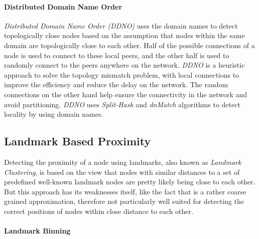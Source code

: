 \documentclass[acmcsur,acmnow]{acmtrans2m}
\begin{document}
\paragraph*{\bf Distributed Domain Name Order}

\emph{Distributed Domain Name Order (DDNO)} \cite{zeinalipour-yazti_ddno_2005}
uses the domain names to detect topologically close nodes based on the
assumption that nodes within the same domain are topologically close to each
other. Half of the possible connections of a node is used to connect to these
local peers, and the other half is used to randomly connect to the peers
anywhere on the network.  \textit{DDNO} is a heuristic approach to solve the
topology mismatch problem, with local connections to improve the efficiency and
reduce the delay on the network.  The random connections on the other hand help
ensure the connectivity in the network and avoid partitioning. \textit{DDNO}
uses \textit{Split-Hash} and \textit{dnMatch} algorithms to detect locality by
using domain names.

\subsection{Landmark Based Proximity}\label{sec:landmark}

Detecting the proximity of a node using landmarks, also known as \textit{Landmark
Clustering}, is based on the view that nodes with similar distances to a
set of predefined well-known landmark nodes are pretty likely being close to
each other. But this approach has its weaknesses itself, like the fact that
is a rather coarse grained approximation, therefore not particularly well suited
for detecting the correct positions of nodes within close distance to each other.

\paragraph*{\bf Landmark Binning}\label{sec:landmark_binning}
\end{document}
